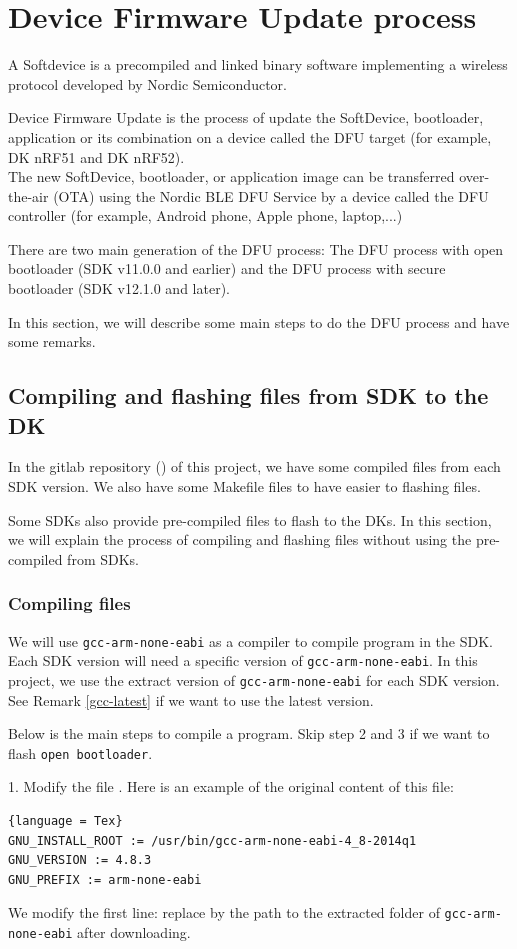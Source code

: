 \documentclass{article}
\theoremstyle{plain}
\theoremstyle{definition}
\numberwithin{equation}{section}
\begin{document}
\section{Device Firmware Update process}\label{dfu}

A Softdevice is a precompiled and linked binary software implementing a wireless protocol developed by Nordic Semiconductor.

Device Firmware Update is the process of update the SoftDevice, bootloader, application or its combination on a device called the DFU target (for example, DK nRF51 and DK nRF52).\\
The new SoftDevice, bootloader, or application image can be transferred over-the-air (OTA) using the Nordic BLE DFU Service by a device called the DFU controller (for example, Android phone, Apple phone, laptop,...)

There are two main generation of the DFU process: The DFU process with open bootloader (SDK v11.0.0 and earlier) and the DFU process with secure bootloader (SDK v12.1.0 and later).

In this section, we will describe some main steps to do the DFU process and have some remarks.

\subsection{Compiling and flashing files from SDK to the DK}
In the gitlab repository (\cite{gitlab}) of this project, we have some compiled files from each SDK version. We also have some Makefile files to have easier to flashing files.

Some SDKs also provide pre-compiled files to flash to the DKs. In this section, we will explain the process of compiling and flashing files without using the pre-compiled from SDKs.
\subsubsection{Compiling files}
We will use \texttt{gcc-arm-none-eabi} as a compiler to compile program in the SDK. Each SDK version will need a specific version of \texttt{gcc-arm-none-eabi}. In this project, we use the extract version of \texttt{gcc-arm-none-eabi} for each SDK version. See Remark \ref{gcc-latest} if we want to use the latest version.


Below is the main steps to compile a program. Skip step 2 and 3 if we want to flash \texttt{open bootloader}.

1. Modify the file . Here is an example of the original content of this file:
\begin{lstlisting}{language = Tex}
GNU_INSTALL_ROOT := /usr/bin/gcc-arm-none-eabi-4_8-2014q1
GNU_VERSION := 4.8.3
GNU_PREFIX := arm-none-eabi
\end{lstlisting}
We modify the first line: replace  by the path to the extracted folder of \texttt{gcc-arm-none-eabi} after downloading.
\end{document}
